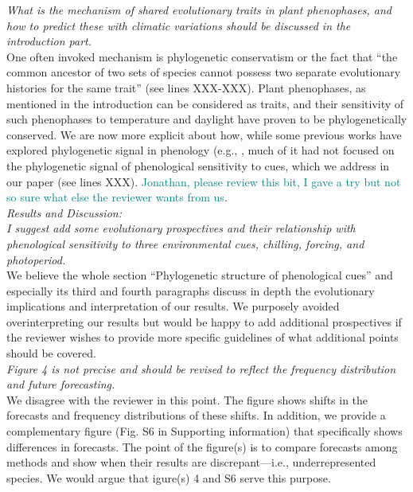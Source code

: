 \documentclass[11pt]{article}
\begin{document}
\emph{What is the mechanism of shared evolutionary traits in plant phenophases, and how to predict these with climatic variations should be discussed in the introduction part.}\\
One often invoked mechanism is phylogenetic conservatism or the fact that ``the common ancestor of two sets of species cannot possess two separate evolutionary histories for the same trait'' (see lines XXX-XXX). Plant phenophases, as mentioned in the introduction can be considered as traits, and their sensitivity of such phenophases to temperature and daylight have proven to be phylogenetically conserved. We are now more explicit about how, while some previous works have explored phylogenetic signal in phenology (e.g., \cite{davies2013phylogenetic}, much of it had not focused on the phylogenetic signal of phenological sensitivity to cues, which we address in our paper (see lines XXX).
\textcolor{teal}{Jonathan, please review this bit, I gave a try but not so sure what else the reviewer wants from us}.\\


\emph{Results and Discussion:}\\
\emph{I suggest add some evolutionary prospectives and their relationship with phenological sensitivity to three environmental cues, chilling, forcing, and photoperiod.}\\
We believe the whole section ``Phylogenetic structure of phenological cues'' and especially its third and fourth paragraphs discuss in depth the evolutionary implications and interpretation of our results. We purposely avoided overinterpreting our results but would be happy to add additional prospectives if the reviewer wishes to provide more specific guidelines of what additional points should be covered.\\

\emph{Figure 4 is not precise and should be revised to reflect the frequency distribution and future forecasting.}\\
We disagree with the reviewer in this point. The figure shows shifts in the forecasts and frequency distributions of these shifts. In addition, we provide a complementary figure (Fig. S6 in Supporting information) that specifically shows differences in forecasts. The point of the figure(s) is to compare forecasts among methods and show when their results are discrepant---i.e., underrepresented species. We would argue that igure(s) 4 and S6 serve this purpose.\\
\end{document}
